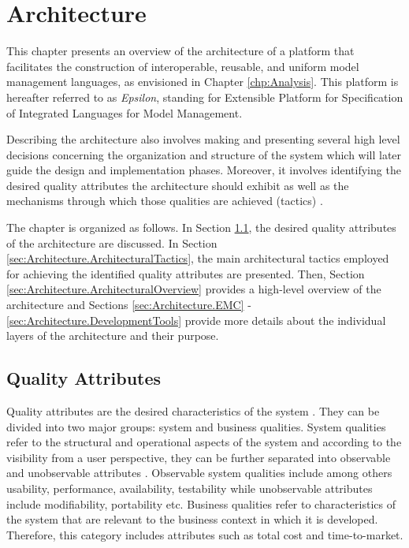 \chapter{Architecture}
\label{chp:Architecture}

This chapter presents an overview of the architecture of a platform that facilitates the construction of interoperable, reusable, and uniform model management languages, as envisioned in Chapter \ref{chp:Analysis}. This platform is hereafter referred to as \emph{Epsilon}, standing for Extensible Platform for Specification of Integrated Languages for Model Management. 

Describing the architecture also involves making and presenting several high level decisions concerning the organization and structure of the system which will later guide the design and implementation phases. Moreover, it involves identifying the desired quality attributes the architecture should exhibit as well as the mechanisms through which those qualities are achieved (tactics) \cite{SEI}.

The chapter is organized as follows. In Section \ref{sec:Architecture.QualityAttributes}, the desired quality attributes of the architecture are discussed. In Section \ref{sec:Architecture.ArchitecturalTactics}, the main architectural tactics employed for achieving the identified quality attributes are presented. Then, Section \ref{sec:Architecture.ArchitecturalOverview} provides a high-level overview of the architecture and Sections \ref{sec:Architecture.EMC} - \ref{sec:Architecture.DevelopmentTools} provide more details about the individual layers of the architecture and their purpose.

\section{Quality Attributes}
\label{sec:Architecture.QualityAttributes}

Quality attributes are the desired characteristics of the system \cite{SEI}. They can be divided into two major groups: system and business qualities. System qualities refer to the structural and operational aspects of the system and according to the visibility from a user perspective, they can be further separated into observable and unobservable attributes \cite{SEI}. Observable system qualities include among others usability, performance, availability, testability while unobservable attributes include modifiability, portability etc. Business qualities refer to characteristics of the system that are relevant to the business context in which it is developed. Therefore, this category includes attributes such as total cost and time-to-market.


